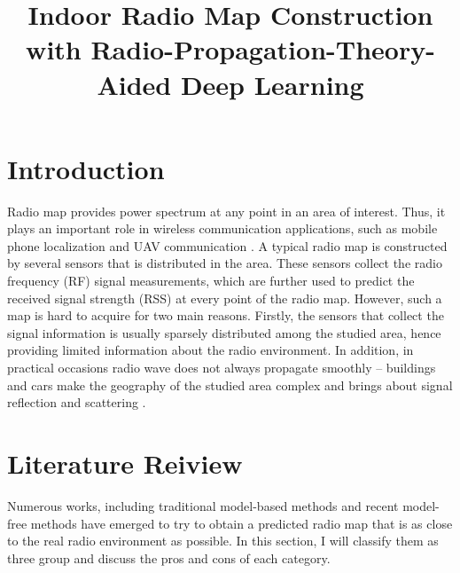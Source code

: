 \documentclass[conference]{IEEEtran}
\begin{document}
\title{Indoor Radio Map Construction with Radio-Propagation-Theory-Aided Deep Learning\\


}

\author{
}

\maketitle



\section{Introduction}
Radio map provides power spectrum at any point in an area of interest. Thus, it plays an important role in wireless communication applications, such as mobile phone localization and UAV communication \cite{b1}\cite{b2}. A typical radio map is constructed by several sensors that is distributed in the area. These sensors collect the radio frequency (RF) signal measurements, which are further used to predict the received signal strength (RSS) at every point of the radio map. However, such a map is hard to acquire for two main reasons. Firstly, the sensors that collect the signal information is usually sparsely distributed among the studied area, hence providing limited information about the radio environment. In addition, in practical occasions radio wave does not always propagate smoothly – buildings and cars make the geography of the studied area complex and brings about signal reflection and scattering \cite{b3}. 



\section{Literature Reiview}
Numerous works, including traditional model-based methods and recent model-free methods have emerged to try to obtain a predicted radio map that is as close to the real radio environment as possible. In this section, I will classify them as three group and discuss the pros and cons of each category.
\end{document}
